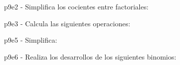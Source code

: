 \documentclass[spanish, 11pt]{exam}
\begin{document}
\begin{questions}
\begin{multicols}{3}
\begin{parts}
        \end{parts}
        \end{multicols}
        \question p9e2 - Simplifica los cocientes entre factoriales:
        \begin{multicols}{3} 
        \end{multicols}
        \question p9e3 - Calcula las siguientes operaciones:
        \begin{multicols}{3} 
        \end{multicols}
        \question p9e5 - Simplifica:
        \begin{multicols}{3} 
        \end{multicols}
        \question p9e6 - Realiza los desarrollos de los siguientes binomios:
        \begin{multicols}{3} 
\end{multicols}
\end{questions}
\end{document}
